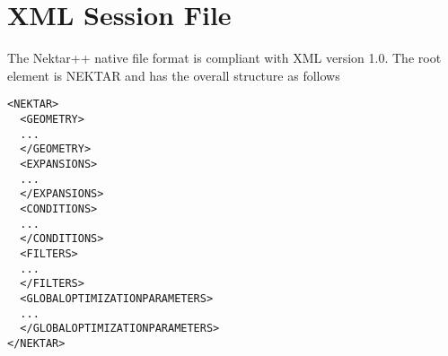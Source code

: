 \chapter{XML Session File}
\label{s:xml}

The Nektar++ native file format is compliant with XML version 1.0. The root element is NEKTAR and has the overall structure as follows
\begin{lstlisting}[style=XMLStyle]
<NEKTAR>
  <GEOMETRY>
  ...
  </GEOMETRY>
  <EXPANSIONS>
  ...
  </EXPANSIONS>
  <CONDITIONS>
  ...
  </CONDITIONS>
  <FILTERS>
  ...
  </FILTERS>
  <GLOBALOPTIMIZATIONPARAMETERS>
  ...
  </GLOBALOPTIMIZATIONPARAMETERS>
</NEKTAR>
\end{lstlisting}












